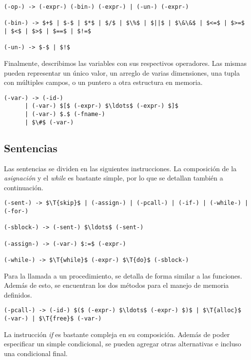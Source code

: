 \documentclass{article}
\begin{document}
\begin{lstlisting}[style = syntax]
(-op-) -> (-expr-) (-bin-) (-expr-) | (-un-) (-expr-)

(-bin-) -> $+$ | $-$ | $*$ | $/$ | $\%$ | $||$ | $\&\&$ | $<=$ | $>=$ | $<$ | $>$ | $==$ | $!=$

(-un-) -> $-$ | $!$
\end{lstlisting}

Finalmente, describimos las variables con sus respectivos operadores.
Las mismas pueden representar un único valor, un arreglo de varias dimensiones, una tupla con múltiples campos, o un puntero a otra estructura en memoria. 

\begin{lstlisting}[style = syntax]
(-var-) -> (-id-)
      | (-var-) $[$ (-expr-) $\ldots$ (-expr-) $]$
      | (-var-) $.$ (-fname-)
      | $\#$ (-var-)
\end{lstlisting}

\subsection{Sentencias}

Las sentencias se dividen en las siguientes instrucciones.
La composición de la \textit{asignación} y el \textit{while} es bastante simple, por lo que se detallan también a continuación.

\begin{lstlisting}[style = syntax]
(-sent-) -> $\T{skip}$ | (-assign-) | (-pcall-) | (-if-) | (-while-) | (-for-)

(-sblock-) -> (-sent-) $\ldots$ (-sent-)

(-assign-) -> (-var-) $:=$ (-expr-)

(-while-) -> $\T{while}$ (-expr-) $\T{do}$ (-sblock-)
\end{lstlisting}

Para la llamada a un procedimiento, se detalla de forma similar a las funciones.
Además de esto, se encuentran los dos métodos para el manejo de memoria definidos.

\begin{lstlisting}[style = syntax]
(-pcall-) -> (-id-) $($ (-expr-) $\ldots$ (-expr-) $)$ | $\T{alloc}$ (-var-) | $\T{free}$ (-var-)
\end{lstlisting}

La instrucción \textit{if} es bastante compleja en su composición.
Además de poder especificar un simple condicional, se pueden agregar otras alternativas e incluso una condicional final.
\end{document}
